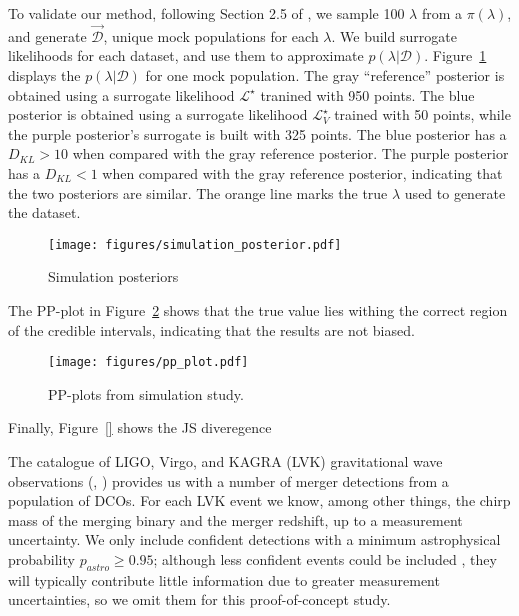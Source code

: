 \documentclass[twocolumn]{aastex631}
\newcommand\COMPAS{{\sc{COMPAS}}\xspace}
\begin{document}
To validate our method, following Section 2.5 of \citep{}, we sample 100 $\lambda$ from a $\pi(\lambda)$, and generate $\vec{\mathcal{D}}$, unique mock \COMPAS populations for each $\lambda$.
We build surrogate likelihoods for each dataset, and use them to approximate $p(\lambda|\mathcal{D})$.
Figure~\ref{fig:simulation_posterior} displays the $p(\lambda|\mathcal{D})$ for one mock population.
The gray ``reference'' posterior is obtained using a surrogate likelihood $\mathcal{L}^{\star}$ tranined with 950 points.
The blue posterior is obtained using a surrogate likelihood $\mathcal{L}^{\star}_V$ trained with 50 points, while the purple posterior's surrogate is built with 325 points.
The blue posterior has a $D_{KL}>10$ when compared with the gray reference posterior.
The purple  posterior has a $D_{KL}<1$ when compared with the gray reference posterior, indicating that the two posteriors are similar.
The orange line marks the true $\lambda$ used to generate the dataset.
\begin{figure}[ht!]
    \begin{centering}
        \texttt{[image: figures/simulation\_posterior.pdf]}
        \caption{
            Simulation posteriors
        }
        \label{fig:simulation_posterior}
    \end{centering}
\end{figure}


The PP-plot in Figure~\ref{fig:pp_plot} shows that the true value lies withing the correct region of the credible intervals, indicating that the results are not biased.
\begin{figure}[ht!]
    \begin{centering}
        \texttt{[image: figures/pp\_plot.pdf]}
        \caption{
            PP-plots from simulation study.
        }
        \label{fig:pp_plot}
    \end{centering}
\end{figure}


Finally, Figure~\ref{} shows the JS diveregence



The catalogue of LIGO, Virgo, and KAGRA (LVK) gravitational wave observations (\citet{GWTC-2_1_zenodo}, \citet{GWTC-3_zenodo}) provides us with a number of merger detections from a population of \acp{DCO}.  For each LVK event we know, among other things, the chirp mass of the merging binary and the merger redshift, up to a measurement uncertainty. We only include confident detections with a minimum astrophysical probability $p_{astro} \ge 0.95$; although less confident events could be included \citep[e.g.][]{Farr_2015}, they will typically contribute little information due to greater measurement uncertainties, so we omit them for this proof-of-concept study.
\end{document}
